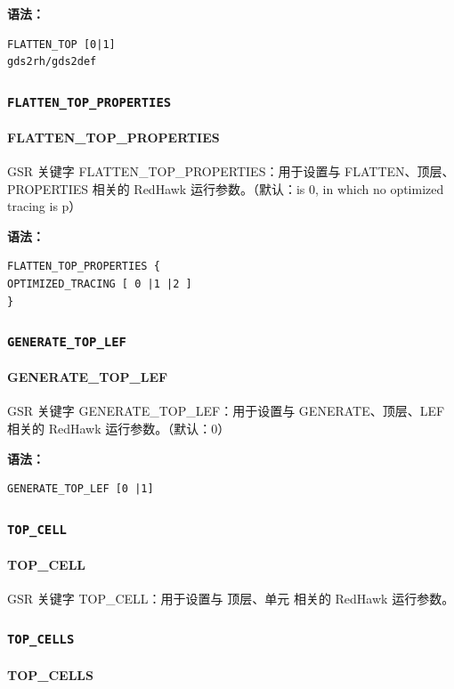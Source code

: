 \textbf{语法：}
\begin{lstlisting}
FLATTEN_TOP [0|1]
gds2rh/gds2def
\end{lstlisting}

\subsubsection{\texttt{FLATTEN_TOP_PROPERTIES}}
\paragraph*{FLATTEN_TOP_PROPERTIES}

GSR 关键字 FLATTEN_TOP_PROPERTIES：用于设置与 FLATTEN、顶层、PROPERTIES 相关的 RedHawk 运行参数。（默认：is 0, in which no optimized tracing is p）

\textbf{语法：}
\begin{lstlisting}
FLATTEN_TOP_PROPERTIES {
OPTIMIZED_TRACING [ 0 |1 |2 ]
}
\end{lstlisting}

\subsubsection{\texttt{GENERATE_TOP_LEF}}
\paragraph*{GENERATE_TOP_LEF}

GSR 关键字 GENERATE_TOP_LEF：用于设置与 GENERATE、顶层、LEF 相关的 RedHawk 运行参数。（默认：0）

\textbf{语法：}
\begin{lstlisting}
GENERATE_TOP_LEF [0 |1]
\end{lstlisting}

\subsubsection{\texttt{TOP_CELL}}
\paragraph*{TOP_CELL}

GSR 关键字 TOP_CELL：用于设置与 顶层、单元 相关的 RedHawk 运行参数。

\subsubsection{\texttt{TOP_CELLS}}
\paragraph*{TOP_CELLS}

